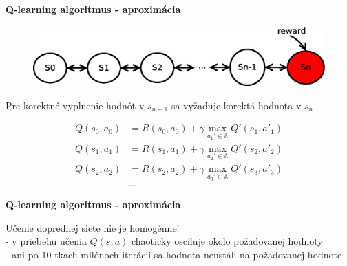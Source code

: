 \documentclass[xcolor=dvipsnames]{beamer}
\begin{document}
\begin{frame}{\bf Q-learning algoritmus - aproximácia}

\begin{figure}[!htb]
\includegraphics[scale=.5]{../diagrams/q_chain_problem.eps}
\end{figure}

Pre korektné vyplnenie hodnôt v $s_{n-1}$ sa vyžaduje korektá hodnota v $s_{n}$

\begin{align}
    Q(s_{0},a_{0}) &= R(s_{0},a_{0}) + \gamma \max_{a_{1}' \in \mathbb{A}} Q'(s_{1}, a'_{1}) \nonumber\\
    Q(s_{1},a_{1}) &= R(s_{1},a_{1}) + \gamma \max_{a_{2}' \in \mathbb{A}} Q'(s_{2}, a'_{2}) \nonumber\\
    Q(s_{2},a_{2}) &= R(s_{2},a_{2}) + \gamma \max_{a_{3}' \in \mathbb{A}} Q'(s_{3}, a'_{3}) \nonumber\\
    & \dots
\end{align}

\end{frame}



\begin{frame}{\bf Q-learning algoritmus - aproximácia}

Učenie doprednej siete nie je homogénne! \\
- v priebehu učenia $Q(s,a)$ chaoticky osciluje okolo požadovanej hodnoty \\
- ani po 10-tkach milónoch iterácií sa hodnota neustáli na požadovanej hodnote


\end{frame}
\end{document}
